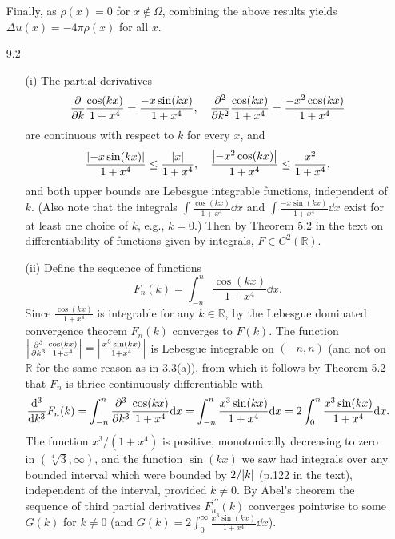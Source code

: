 \documentclass[11pt]{article}
\begin{document}
\begin{enumerate}
    Finally, as $\rho(x) = 0$ for $x\not\in\Omega$, combining the above results yields $\Delta u(x) = -4\pi\rho(x)$ for all $x$.
    
    \hrulefill
    \item[9.2] \begin{enumerate}
        \item[(i)] The partial derivatives 
        \[\pdv{k} \frac{\cos(kx)}{1+x^4} = \frac{-x\sin(kx)}{1+x^4}, \quad \pdv[2]{k} \frac{\cos(kx)}{1+x^4} = \frac{-x^2\cos(kx)}{1+x^4}\] are continuous with respect to $k$ for every $x$, and \[\frac{\abs{-x\sin(kx)}}{1+x^4}\leq \frac{\abs{x}}{1+x^4},\quad \frac{\abs{-x^2\cos(kx)}}{1+x^4}\leq \frac{x^2}{1+x^4},\] and both upper bounds are Lebesgue integrable functions, independent of $k$. (Also note that the integrals $\int \frac{\cos(kx)}{1+x^4}\dd x$ and $\int \frac{-x\sin(kx)}{1+x^4}\dd x$ exist for at least one choice of $k$, e.g., $k = 0$.) Then by Theorem 5.2 in the text on differentiability of functions given by integrals, $F\in C^2(\mathbb{R})$.
        \item[(ii)] Define the sequence of functions \[F_n(k) = \int_{-n}^n \frac{\cos(kx)}{1+x^4}\dd x.\] Since $\frac{\cos(kx)}{1+x^4}$ is integrable for any $k\in \mathbb{R}$, by the Lebesgue dominated convergence theorem $F_n(k)$ converges to $F(k)$. The function $\abs{\pdv[3]{k}\frac{\cos(kx)}{1+x^4}} = \abs{\frac{x^3\sin(kx)}{1+x^4}}$ is Lebesgue integrable on $(-n,n)$ (and not on $\mathbb{R}$ for the same reason as in 3.3(a)), from which it follows by Theorem 5.2 that $F_n$ is thrice continuously differentiable with \[\dv[3]{k} F_n(k) = \int_{-n}^n \pdv[3]{k}\frac{\cos(kx)}{1+x^4}\dd x = \int_{-n}^n \frac{x^3\sin(kx)}{1+x^4} \dd x = 2\int_0^n \frac{x^3\sin(kx)}{1+x^4} \dd x.\] The function $x^3/(1+x^4)$ is positive, monotonically decreasing to zero in $(\sqrt[4]{3},\infty)$, and the function $\sin(kx)$ we saw had integrals over any bounded interval which were bounded by $2/\abs{k}$ (p.122 in the text), independent of the interval, provided $k\neq 0$. By Abel's theorem the sequence of third partial derivatives $F^{\prime\prime\prime}_n(k)$ converges pointwise to some $G(k)$ for $k\neq 0$ (and $G(k) = 2\int_0^\infty \frac{x^3\sin(kx)}{1+x^4} \dd x$).
        

\end{enumerate}
\end{enumerate}
\end{document}
